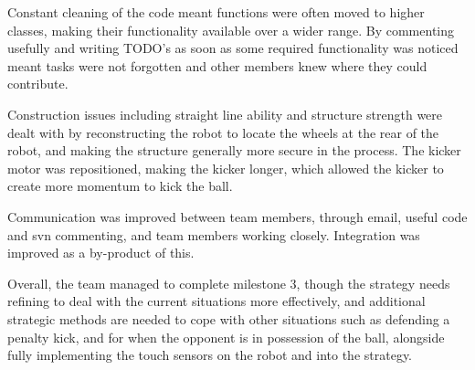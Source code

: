 \documentclass[12pt]{article}
\begin{document}
\begin{flushleft}
Constant cleaning of the code meant functions were often moved to higher classes, making their functionality available over a wider range. By commenting usefully and writing TODO's as soon as some required functionality was noticed meant tasks were not forgotten and other members knew where they could contribute. \linebreak


Construction issues including straight line ability and structure strength were dealt with by reconstructing the robot to locate the wheels at the rear of the robot, and making the structure generally more secure in the process. The kicker motor was repositioned, making the kicker longer, which allowed the kicker to create more momentum to kick the ball. \linebreak

Communication was improved between team members, through email, useful code and svn commenting, and team members working closely. Integration was improved as a by-product of this. \linebreak

Overall, the team managed to complete milestone 3, though the strategy needs refining to deal with the current situations more effectively, and additional strategic methods are needed to cope with other situations such as defending a penalty kick, and for when the opponent is in possession of the ball, alongside fully implementing the touch sensors on the robot and into the strategy.




\end{flushleft}
\end{document}
